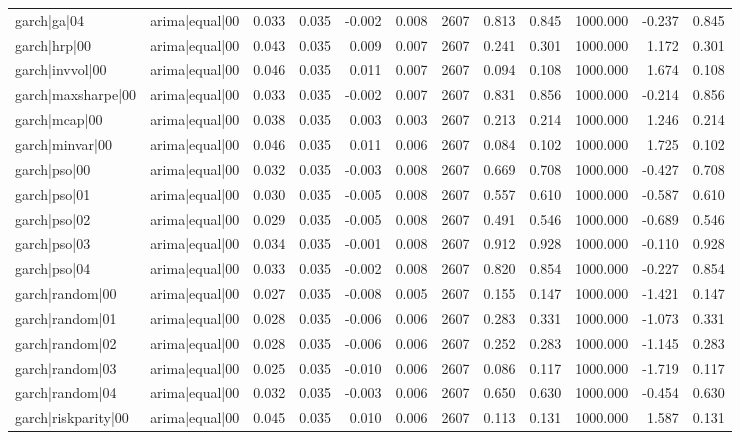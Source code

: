\begin{table}
\begin{tabular}{llrrrrrrrrrr}
garch|ga|04 & arima|equal|00 & 0.033 & 0.035 & -0.002 & 0.008 & 2607 & 0.813 & 0.845 & 1000.000 & -0.237 & 0.845 \\
garch|hrp|00 & arima|equal|00 & 0.043 & 0.035 & 0.009 & 0.007 & 2607 & 0.241 & 0.301 & 1000.000 & 1.172 & 0.301 \\
garch|invvol|00 & arima|equal|00 & 0.046 & 0.035 & 0.011 & 0.007 & 2607 & 0.094 & 0.108 & 1000.000 & 1.674 & 0.108 \\
garch|maxsharpe|00 & arima|equal|00 & 0.033 & 0.035 & -0.002 & 0.007 & 2607 & 0.831 & 0.856 & 1000.000 & -0.214 & 0.856 \\
garch|mcap|00 & arima|equal|00 & 0.038 & 0.035 & 0.003 & 0.003 & 2607 & 0.213 & 0.214 & 1000.000 & 1.246 & 0.214 \\
garch|minvar|00 & arima|equal|00 & 0.046 & 0.035 & 0.011 & 0.006 & 2607 & 0.084 & 0.102 & 1000.000 & 1.725 & 0.102 \\
garch|pso|00 & arima|equal|00 & 0.032 & 0.035 & -0.003 & 0.008 & 2607 & 0.669 & 0.708 & 1000.000 & -0.427 & 0.708 \\
garch|pso|01 & arima|equal|00 & 0.030 & 0.035 & -0.005 & 0.008 & 2607 & 0.557 & 0.610 & 1000.000 & -0.587 & 0.610 \\
garch|pso|02 & arima|equal|00 & 0.029 & 0.035 & -0.005 & 0.008 & 2607 & 0.491 & 0.546 & 1000.000 & -0.689 & 0.546 \\
garch|pso|03 & arima|equal|00 & 0.034 & 0.035 & -0.001 & 0.008 & 2607 & 0.912 & 0.928 & 1000.000 & -0.110 & 0.928 \\
garch|pso|04 & arima|equal|00 & 0.033 & 0.035 & -0.002 & 0.008 & 2607 & 0.820 & 0.854 & 1000.000 & -0.227 & 0.854 \\
garch|random|00 & arima|equal|00 & 0.027 & 0.035 & -0.008 & 0.005 & 2607 & 0.155 & 0.147 & 1000.000 & -1.421 & 0.147 \\
garch|random|01 & arima|equal|00 & 0.028 & 0.035 & -0.006 & 0.006 & 2607 & 0.283 & 0.331 & 1000.000 & -1.073 & 0.331 \\
garch|random|02 & arima|equal|00 & 0.028 & 0.035 & -0.006 & 0.006 & 2607 & 0.252 & 0.283 & 1000.000 & -1.145 & 0.283 \\
garch|random|03 & arima|equal|00 & 0.025 & 0.035 & -0.010 & 0.006 & 2607 & 0.086 & 0.117 & 1000.000 & -1.719 & 0.117 \\
garch|random|04 & arima|equal|00 & 0.032 & 0.035 & -0.003 & 0.006 & 2607 & 0.650 & 0.630 & 1000.000 & -0.454 & 0.630 \\
garch|riskparity|00 & arima|equal|00 & 0.045 & 0.035 & 0.010 & 0.006 & 2607 & 0.113 & 0.131 & 1000.000 & 1.587 & 0.131 \\

\end{tabular}
\end{table}

